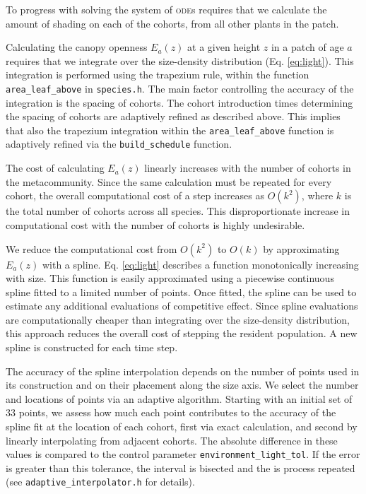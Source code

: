 \documentclass[10pt,twoside]{article}
\begin{document}
To progress with solving the system of \textsc{ode}s requires that we calculate the amount of
shading on each of the cohorts, from all other plants in the
patch.

Calculating the canopy openness \(E_a(z)\) at a given height \(z\) in a patch of age \(a\) requires that
we integrate over the size-density distribution (Eq. \ref{eq:light}). This
integration is performed using the trapezium rule, within the function
\texttt{area\_leaf\_above} in \texttt{species.h}. The main factor
controlling the accuracy of the integration is the spacing of cohorts.
The cohort introduction times determining the
spacing of cohorts are adaptively refined as described above. This implies that also the trapezium integration
within the \texttt{area\_leaf\_above} function is adaptively refined
via the \texttt{build\_schedule} function.

The cost of calculating \(E_a(z)\) linearly increases with the number of
cohorts in the metacommunity. Since the same calculation must be repeated
for every cohort, the overall computational cost
of a step increases as \(O(k^2 )\), where \(k\) is the
total number of cohorts across all species. This disproportionate
increase in computational cost with the number of cohorts is highly undesirable.

We reduce the computational cost
from \(O(k^2)\) to \(O(k)\) by approximating \(E_a(z)\) with a
spline. Eq. \ref{eq:light} describes a function monotonically
increasing with size. This function is easily
approximated using a piecewise continuous spline fitted to a limited
number of points. Once fitted, the spline can be used to estimate any
additional evaluations of competitive effect. Since spline
evaluations are computationally cheaper than integrating over the size-density distribution,
this approach reduces the overall cost of stepping the resident
population. A new spline is constructed for each time step.

The accuracy of the spline interpolation depends on the number of points
used in its construction and on their placement along the size axis. We
select the number and locations of points via an adaptive algorithm.
Starting with an initial set of 33 points, we assess how much each point
contributes to the accuracy of the spline fit at the location of each
cohort, first via exact calculation, and second by linearly interpolating
from adjacent cohorts. The absolute difference in these values is
compared to the control parameter \texttt{environment\_light\_tol}. If
the error is greater than this tolerance, the interval is bisected and the is
process repeated (see
\texttt{adaptive\_interpolator.h} for details).
\end{document}
